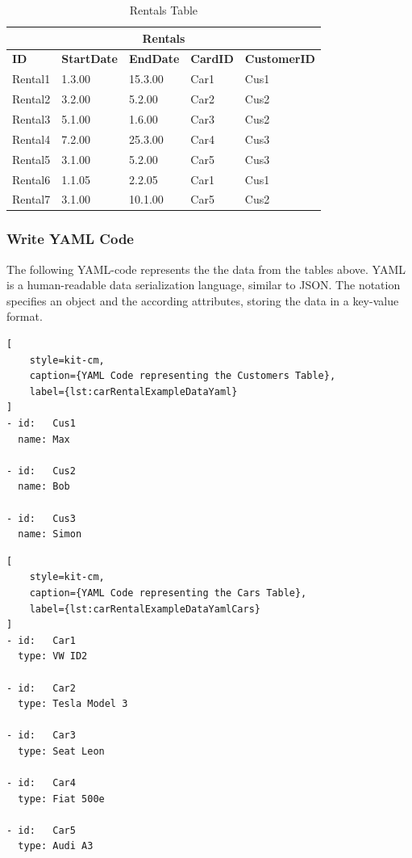 \begin{table}[H]
    \centering
    \caption{Rentals Table}    
    \label{tab:carRentalExampleDataRentals}
    \begin{tabular}{|p{2cm}|p{2cm}|p{2cm}|p{2cm}|p{3cm}|}
        \hline
        \multicolumn{5}{|c|}{\textbf{Rentals}} \\
        \hline
        \textbf{ID} & \textbf{StartDate} & \textbf{EndDate} & \textbf{CardID} & \textbf{CustomerID} \\        
        \hline
        Rental1 & 1.3.00 & 15.3.00 & Car1 & Cus1 \\
        Rental2 & 3.2.00 & 5.2.00 & Car2 & Cus2 \\
        Rental3 & 5.1.00 & 1.6.00 & Car3 & Cus2 \\
        Rental4 & 7.2.00 & 25.3.00 & Car4 & Cus3 \\
        Rental5 & 3.1.00 & 5.2.00 & Car5 & Cus3 \\
        Rental6 & 1.1.05 & 2.2.05 & Car1 & Cus1 \\
        Rental7 & 3.1.00 & 10.1.00 & Car5 & Cus2 \\
        \hline
    \end{tabular}
\end{table}

\subsubsection*{Write YAML Code}
The following YAML-code represents the the data from the tables above.
YAML is a human-readable data serialization language, similar to JSON.
The notation specifies an object and the according attributes, storing the data in a key-value format.

\begin{lstlisting}[
    style=kit-cm,
    caption={YAML Code representing the Customers Table},
    label={lst:carRentalExampleDataYaml}
]
- id:   Cus1
  name: Max

- id:   Cus2
  name: Bob

- id:   Cus3
  name: Simon
\end{lstlisting}

\begin{lstlisting}[
    style=kit-cm,
    caption={YAML Code representing the Cars Table},
    label={lst:carRentalExampleDataYamlCars}
]
- id:   Car1
  type: VW ID2

- id:   Car2
  type: Tesla Model 3

- id:   Car3
  type: Seat Leon

- id:   Car4
  type: Fiat 500e

- id:   Car5
  type: Audi A3
\end{lstlisting}

